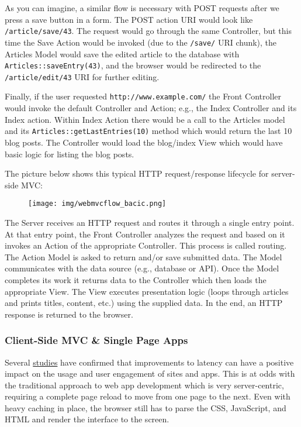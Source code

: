 \documentclass[9pt]{book}
\begin{document}
As you can imagine, a similar flow is necessary with POST requests after
we press a save button in a form. The POST action URI would look like
\texttt{/article/save/43}. The request would go through the same
Controller, but this time the Save Action would be invoked (due to the
\texttt{/save/} URI chunk), the Articles Model would save the edited
article to the database with \texttt{Articles::saveEntry(43)}, and the
browser would be redirected to the \texttt{/article/edit/43} URI for
further editing.

Finally, if the user requested \texttt{http://www.example.com/} the
Front Controller would invoke the default Controller and Action; e.g.,
the Index Controller and its Index action. Within Index Action there
would be a call to the Articles model and its
\texttt{Articles::getLastEntries(10)} method which would return the last
10 blog posts. The Controller would load the blog/index View which would
have basic logic for listing the blog posts.

The picture below shows this typical HTTP request/response lifecycle for
server-side MVC:

\begin{figure}[htbp]
\centering
\texttt{[image: img/webmvcflow\_bacic.png]}
\end{figure}

The Server receives an HTTP request and routes it through a single entry
point. At that entry point, the Front Controller analyzes the request
and based on it invokes an Action of the appropriate Controller. This
process is called routing. The Action Model is asked to return and/or
save submitted data. The Model communicates with the data source (e.g.,
database or API). Once the Model completes its work it returns data to
the Controller which then loads the appropriate View. The View executes
presentation logic (loops through articles and prints titles, content,
etc.) using the supplied data. In the end, an HTTP response is returned
to the browser.

\subsubsection{Client-Side MVC \& Single Page
Apps}\label{client-side-mvc-single-page-apps}

Several
\href{http://radar.oreilly.com/2009/07/velocity-making-your-site-fast.html}{studies}
have confirmed that improvements to latency can have a positive impact
on the usage and user engagement of sites and apps. This is at odds with
the traditional approach to web app development which is very
server-centric, requiring a complete page reload to move from one page
to the next. Even with heavy caching in place, the browser still has to
parse the CSS, JavaScript, and HTML and render the interface to the
screen.
\end{document}
